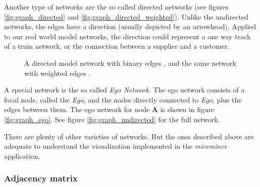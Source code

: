 Another type of networks are the so called directed networks (see figures \ref{fig:graph_directed} and \ref{fig:graph_directed_weighted}). Unlike the undirected networks, the edges have a direction (usually depicted by an arrowhead). Applied to our real world model networks, the direction could represent a one way track of a train network, or the connection between a supplier and a customer. 

\begin{figure}[htpb]%
	\centering 
	\qquad 
	\caption[Directed model network with binary and weighted edges]{A directed model network with binary edges , and the same network with weighted edges .} 

\end{figure}

A special network is the so called \textit{Ego Network}. The ego network consists of a focal node, called the \textit{Ego}, and the nodes directly connected to \textit{Ego}, plus the edges between them. The ego network for node \textbf{A} is shown in figure \ref{fig:graph_ego}. See figure \ref{fig:graph_undirected} for the full network.	 

There are plenty of other varieties of networks. But the ones described above are adequate to understand the visualization implemented in the \textit{miceminer} application.

\subsubsection{Adjacency matrix}
\label{subsubsec:adjacency_matrix}

